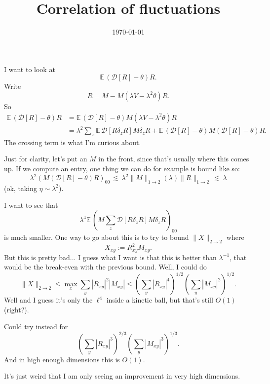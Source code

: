 \documentclass[11pt]{amsart}
\title{Correlation of fluctuations}
\date{\today}
\def\xp{{\mathbb E\,}}
\def\lsim{{\,\lesssim\,}}
\numberwithin{equation}{section}
\newcommand{\mcal}[1]{{\mathcal{#1}}}
\numberwithin{theorem}{section}
\begin{document}
\maketitle

I want to look at
\[
\xp (\mcal{D}[R]-\theta) R.
\]
Write
\[
R = M - M (\lambda V - \lambda^2 \theta) R.
\]
So
\begin{align*}
\xp (\mcal{D}[R]-\theta)R
&= \xp (\mcal{D}[R]-\theta) M(\lambda V - \lambda^2\theta)R \\
&= \lambda^2 \sum_x\xp \mcal{D}[R\delta_zR] M\delta_z R
+ \xp (\mcal{D}[R]-\theta)M(\mcal{D}[R]-\theta)R.
\end{align*}
The crossing term is what I'm curious about.

Just for clarity, let's put an $M$ in the front, since that's usually where this comes up.
If we compute an entry, one thing we can do for example is bound like so:
\[
\lambda^2 (M (\mcal{D}[R]-\theta)R)_{00} \lsim
\lambda^2 \|M\|_{1\to 2} (\lambda) \|R\|_{1\to 2} \lsim \lambda
\]
(ok, taking $\eta\sim \lambda^2$).

I want to see that
\[
\lambda^4 \xp(M \sum_z \mcal{D}[R\delta_zR]M\delta_z R)_{00}
\]
is much smaller.  One way to go about this is to try to bound $\|X\|_{2\to 2}$ where
\[
X_{xy} := R_{xy}^2 M_{xy}.
\]
But this is pretty bad...
I guess what I want is that this is better than $\lambda^{-1}$, that would be the break-even with the previous bound.
Well, I could do
\[
\|X\|_{2\to 2} \leq \max_x \sum_y |R_{xy}|^2 |M_{xy}|
\leq (\sum_y |R_{xy}|^4)^{1/2} (\sum_y |M_{xy}|^2)^{1/2}.
\]
Well and I guess it's only the $\ell^4$ inside a kinetic ball, but that's still $O(1)$
(right?).

Could try instead for
\[
(\sum_y |R_{xy}|^3)^{2/3} (\sum_y |M_{xy}|^3)^{1/3}.
\]
And in high enough dimensions this is $O(1)$.


It's just weird that I am only seeing an improvement in very high dimensions.
\end{document}
